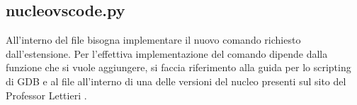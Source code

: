 \subsection{nucleo\textunderscore vscode.py}
All'interno del file  bisogna implementare il nuovo comando richiesto dall'estensione. Per l'effettiva implementazione del comando dipende dalla funzione che si vuole aggiungere, si faccia riferimento alla guida per lo scripting di GDB\cite{GDBpython} e al file  all'interno di una delle versioni del nucleo presenti sul sito del Professor Lettieri \cite{testiEsame}. 


%
%
